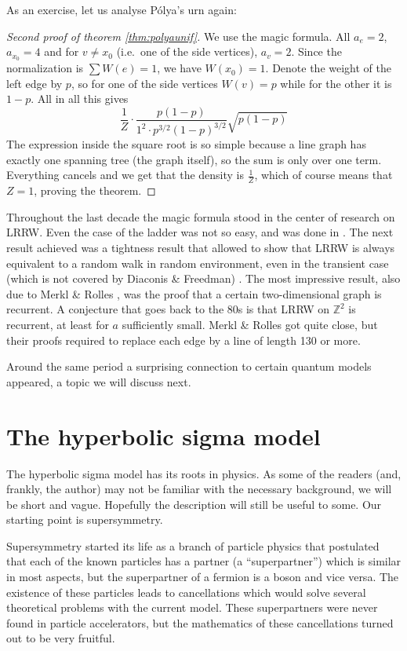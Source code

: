 \documentclass{emsprocart}
\theoremstyle{plain}
\begin{document}
As an exercise, let us analyse P\'olya's urn again:
\begin{proof}
[Second proof of theorem \ref{thm:polyaunif}] We use the magic formula.
All $a_{e}=2$, $a_{x_{0}}=4$ and for $v\ne x_{0}$ (i.e.\ one of
the side vertices), $a_{v}=2$. Since the normalization is $\sum W(e)=1$,
we have $W(x_{0})=1$. Denote the weight of the left edge by $p$,
so for one of the side vertices $W(v)=p$ while for the other it is
$1-p$. All in all this gives
\[
\frac{1}{Z}\cdot\frac{p(1-p)}{1^{2}\cdot p^{3/2}(1-p)^{3/2}}\sqrt{p(1-p)}
\]
The expression inside the square root is so simple because a line
graph has exactly one spanning tree (the graph itself), so the sum
is only over one term. Everything cancels and we get that the density
is $\frac{1}{Z}$, which of course means that $Z=1$, proving the
theorem.
\end{proof}
Throughout the last decade the magic formula stood in the center of
research on LRRW. Even the case of the ladder was not so easy, and
was done in \cite{MR05}. The next result achieved was a tightness
result that allowed to show that LRRW is always equivalent to a random
walk in random environment, even in the transient case (which is not
covered by Diaconis \& Freedman) \cite{MR07}. The most impressive
result, also due to Merkl \& Rolles \cite{MR09}, was the proof that
a certain two-dimensional graph is recurrent. A conjecture that goes
back to the 80s \cite[page 1241]{P88} is that LRRW on $\mathbb{Z}^{2}$
is recurrent, at least for $a$ sufficiently small. Merkl \& Rolles
got quite close, but their proofs required to replace each edge by
a line of length 130 or more.

Around the same period a surprising connection to certain quantum
models appeared, a topic we will discuss next.

\section{The hyperbolic sigma model}

The hyperbolic sigma model has its roots in physics. As some of the
readers (and, frankly, the author) may not be familiar with the necessary
background, we will be short and vague. Hopefully the description
will still be useful to some. Our starting point is supersymmetry.

Supersymmetry started its life as a branch of particle physics that
postulated that each of the known particles has a partner (a ``superpartner'')
which is similar in most aspects, but the superpartner of a fermion
is a boson and vice versa. The existence of these particles leads
to cancellations which would solve several theoretical problems with
the current model. These superpartners were never found in particle
accelerators, but the mathematics of these cancellations turned out
to be very fruitful.
\end{document}
